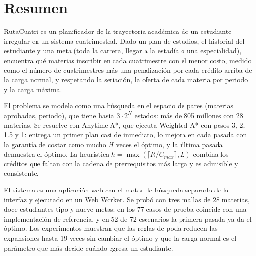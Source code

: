 \chapter*{Resumen} %
RutaCuatri es un planificador de la trayectoria académica de un estudiante irregular en un sistema cuatrimestral. Dado un plan de estudios, el historial del estudiante y una meta (toda la carrera, llegar a la estadía o una especialidad), encuentra qué materias inscribir en cada cuatrimestre con el menor costo, medido como el número de cuatrimestres más una penalización por cada crédito arriba de la carga normal, y respetando la seriación, la oferta de cada materia por periodo y la carga máxima.

El problema se modela como una búsqueda en el espacio de pares (materias aprobadas, periodo), que tiene hasta $3 \cdot 2^{N}$ estados: más de 805 millones con 28 materias. Se resuelve con Anytime A*, que ejecuta Weighted A* con pesos 3, 2, 1.5 y 1: entrega un primer plan casi de inmediato, lo mejora en cada pasada con la garantía de costar como mucho $H$ veces el óptimo, y la última pasada demuestra el óptimo. La heurística $h = \max(\lceil R/C_{max} \rceil, L)$ combina los créditos que faltan con la cadena de prerrequisitos más larga y es admisible y consistente.

El sistema es una aplicación web con el motor de búsqueda separado de la interfaz y ejecutado en un Web Worker. Se probó con tres mallas de 28 materias, doce estudiantes tipo y nueve metas: en los 77 casos de prueba coincide con una implementación de referencia, y en 52 de 72 escenarios la primera pasada ya da el óptimo. Los experimentos muestran que las reglas de poda reducen las expansiones hasta 19 veces sin cambiar el óptimo y que la carga normal es el parámetro que más decide cuándo egresa un estudiante.
